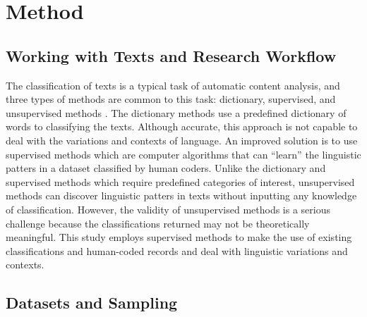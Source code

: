\documentclass[12pt]{article}
\begin{document}


\section{Method}

\subsection{Working with Texts and Research Workflow}

The classification of texts is a typical task of automatic content analysis, and three types of methods are common to this task: dictionary, supervised, and unsupervised methods \parencite[268-269]{GrimmerTextDataPromise2013}. The dictionary methods use a predefined dictionary of words to classifying the texts. Although accurate, this approach is not capable to deal with the variations and contexts of language. An improved solution is to use supervised methods which are computer algorithms that can ``learn'' the linguistic patters in a dataset classified by human coders. Unlike the dictionary and supervised methods which require predefined categories of interest, unsupervised methods can discover linguistic patters in texts without inputting any knowledge of classification. However, the validity of unsupervised methods is a serious challenge because the classifications returned may not be theoretically meaningful. This study employs supervised methods to make the use of existing classifications and human-coded records and deal with linguistic variations and contexts. 



\subsection{Datasets and Sampling}
\end{document}
